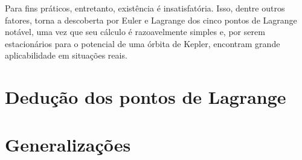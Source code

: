 Para fins práticos, entretanto, existência é insatisfatória. Isso, dentre outros fatores, torna a descoberta por Euler e Lagrange dos cinco pontos de Lagrange notável, uma vez que seu cálculo é razoavelmente simples e, por serem estacionários para o potencial de uma órbita de Kepler, encontram grande aplicabilidade em situações reais.

\section{Dedução dos pontos de Lagrange}


\section{Generalizações}
